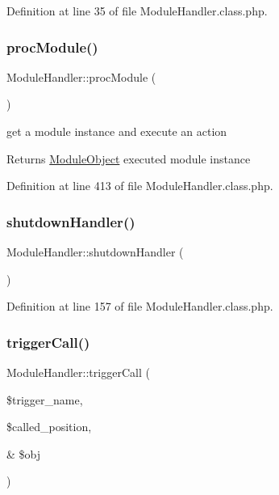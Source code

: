 Definition at line 35 of file Module\+Handler.\+class.\+php.

\mbox{\label{classModuleHandler_a74ad0ae3090eff1da5a6e0e68ce431d0}} 
\subsubsection{\texorpdfstring{proc\+Module()}{procModule()}}
{\footnotesize\ttfamily Module\+Handler\+::proc\+Module (\begin{DoxyParamCaption}{ }\end{DoxyParamCaption})}

get a module instance and execute an action \begin{DoxyReturn}{Returns}
\hyperlink{classModuleObject}{Module\+Object} executed module instance 
\end{DoxyReturn}


Definition at line 413 of file Module\+Handler.\+class.\+php.

\mbox{\label{classModuleHandler_a6295c502e315baa6c563f48ddf08e233}} 
\subsubsection{\texorpdfstring{shutdown\+Handler()}{shutdownHandler()}}
{\footnotesize\ttfamily Module\+Handler\+::shutdown\+Handler (\begin{DoxyParamCaption}{ }\end{DoxyParamCaption})}



Definition at line 157 of file Module\+Handler.\+class.\+php.

\mbox{\label{classModuleHandler_aa1b1f9eae91ccd76e6a81c9375c2e673}} 
\subsubsection{\texorpdfstring{trigger\+Call()}{triggerCall()}}
{\footnotesize\ttfamily Module\+Handler\+::trigger\+Call (\begin{DoxyParamCaption}\item[{}]{\$trigger\+\_\+name,  }\item[{}]{\$called\+\_\+position,  }\item[{\&}]{\$obj }\end{DoxyParamCaption})}

